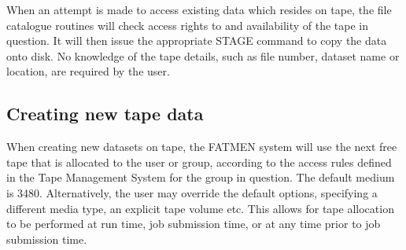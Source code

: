 
When an attempt is made to access existing data which resides on tape,
the file catalogue routines will check access rights to and availability
of the tape in question.
It will then issue the appropriate STAGE command
to copy the data onto disk.
No knowledge of the tape details, such
as file number, dataset name or location, are required by the user.

\subsection{Creating new tape data}

When creating new datasets on tape, the FATMEN system will use
the next free tape that is allocated to the user or group,
according to the access rules defined in the Tape Management System
for the group in question.
The default medium is 3480. Alternatively,
the user may override the default options, specifying a different
media type, an explicit tape volume etc.
This allows for tape allocation
to be performed at run time, job submission time, or at any time
prior to job submission time.
 
